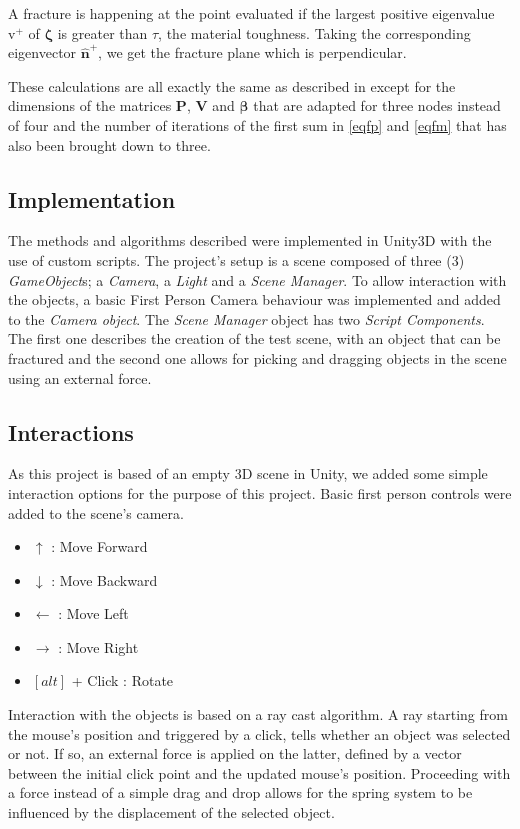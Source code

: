 \documentclass[tog]{acmsiggraph}
\begin{document}
A fracture is happening at the point evaluated if the largest positive eigenvalue $\mathrm{v}^+$ of $\pmb{\zeta}$ is greater than $\tau$, the material toughness. Taking the corresponding eigenvector $\mathrm{\pmb{\hat{n}}}^+$, we get the fracture plane which is perpendicular. 

These calculations are all exactly the same as described in \cite{Obrien:1999:GMA} except for the dimensions of the matrices $\pmb{P}$, $\pmb{V}$ and $\pmb{\beta}$ that are adapted for three nodes instead of four and the number of iterations of the first sum in \eqref{eqfp} and \eqref{eqfm} that has also been brought down to three. 

\subsection{Implementation}
The methods and algorithms described were implemented in Unity3D with the use of custom scripts. The project's setup is a scene composed of three (3) \textit{GameObject}s; a \textit{Camera}, a \textit{Light} and a \textit{Scene Manager}. To allow interaction with the objects, a basic First Person Camera behaviour was implemented and added to the \textit{Camera object}. The \textit{Scene Manager} object has two \textit{Script Components}. The first one describes the creation of the test scene, with an object that can be fractured and the second one allows for picking and dragging objects in the scene using an external force. 

\subsection{Interactions}
As this project is based of an empty 3D scene in Unity, we added some simple interaction options for the purpose of this project. Basic first person controls were added to the scene's camera. 

\begin{itemize}
\setlength\itemsep{0em}
\item $\uparrow$ : Move Forward
\item $\downarrow$ : Move Backward
\item $\leftarrow$ : Move Left
\item $\rightarrow$ : Move Right
\item $\left[alt\right]$ + Click : Rotate 
\end{itemize}

Interaction with the objects is based on a ray cast algorithm. A ray starting from the mouse's position and triggered by a click, tells whether an object was selected or not. If so, an external force is applied on the latter, defined by a vector between the initial click point and the updated mouse's position. Proceeding with a force instead of a simple drag and drop allows for the spring system to be influenced by the displacement of the selected object. 
\end{document}
